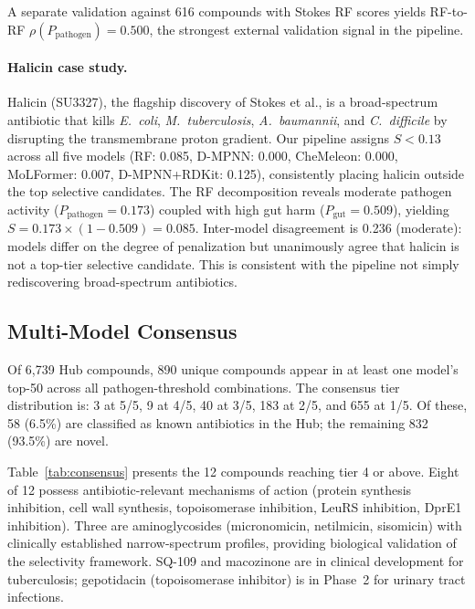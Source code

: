 \documentclass{article}
\newcommand{\pp}{P_{\mathrm{pathogen}}}
\newcommand{\pg}{P_{\mathrm{gut}}}
\begin{document}
A separate validation against 616 compounds with Stokes RF scores yields RF-to-RF $\rho(\pp) = 0.500$, the strongest external validation signal in the pipeline.

\paragraph{Halicin case study.}
Halicin (SU3327), the flagship discovery of Stokes et al., is a broad-spectrum antibiotic that kills \textit{E.~coli}, \textit{M.~tuberculosis}, \textit{A.~baumannii}, and \textit{C.~difficile} by disrupting the transmembrane proton gradient.
Our pipeline assigns $S < 0.13$ across all five models (RF: 0.085, D-MPNN: 0.000, CheMeleon: 0.000, MoLFormer: 0.007, D-MPNN+RDKit: 0.125), consistently placing halicin outside the top selective candidates.
The RF decomposition reveals moderate pathogen activity ($\pp = 0.173$) coupled with high gut harm ($\pg = 0.509$), yielding $S = 0.173 \times (1 - 0.509) = 0.085$.
Inter-model disagreement is 0.236 (moderate): models differ on the degree of penalization but unanimously agree that halicin is not a top-tier selective candidate.
This is consistent with the pipeline not simply rediscovering broad-spectrum antibiotics.

\subsection{Multi-Model Consensus}
\label{sec:consensus_results}

Of 6,739 Hub compounds, 890 unique compounds appear in at least one model's top-50 across all pathogen-threshold combinations.
The consensus tier distribution is: 3 at 5/5, 9 at 4/5, 40 at 3/5, 183 at 2/5, and 655 at 1/5.
Of these, 58 (6.5\%) are classified as known antibiotics in the Hub; the remaining 832 (93.5\%) are novel.

Table~\ref{tab:consensus} presents the 12 compounds reaching tier 4 or above.
Eight of 12 possess antibiotic-relevant mechanisms of action (protein synthesis inhibition, cell wall synthesis, topoisomerase inhibition, LeuRS inhibition, DprE1 inhibition).
Three are aminoglycosides (micronomicin, netilmicin, sisomicin) with clinically established narrow-spectrum profiles, providing biological validation of the selectivity framework.
SQ-109 and macozinone are in clinical development for tuberculosis; gepotidacin (topoisomerase inhibitor) is in Phase~2 for urinary tract infections.
\end{document}
